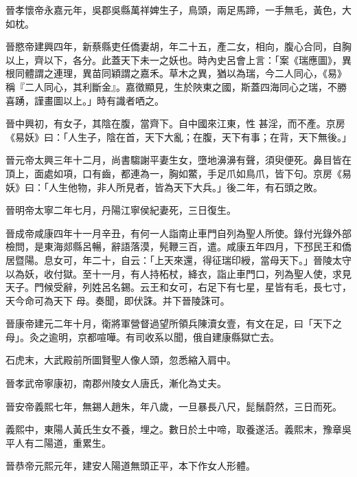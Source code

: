 \begin{pinyinscope}
 晉孝懷帝永嘉元年，吳郡吳縣萬祥婢生子，鳥頭，兩足馬蹄，一手無毛，黃色，大如枕。



 晉愍帝建興四年，新蔡縣吏任僑妻胡，年二十五，產二女，相向，腹心合同，自胸以上，齊以下，各分。此蓋天下未一之妖也。時內史呂會上言：「案《瑞應圖》，異根同體謂之連理，異苗同穎謂之嘉禾。草木之異，猶以為瑞，今二人同心，《易》稱『二人同心，其利斷金』。嘉徵顯見，生於陜東之國，斯蓋四海同心之瑞，不勝喜踴，謹畫圖以上。」時有識者哂之。



 晉中興初，有女子，其陰在腹，當齊下。自中國來江東，性
 甚淫，而不產。京房《易妖》曰：「人生子，陰在首，天下大亂；在腹，天下有事；在背，天下無後。」



 晉元帝太興三年十二月，尚書騶謝平妻生女，墮地濞濞有聲，須臾便死。鼻目皆在頂上，面處如項，口有齒，都連為一，胸如鱉，手足爪如鳥爪，皆下句。京房《易妖》曰：「人生他物，非人所見者，皆為天下大兵。」後二年，有石頭之敗。



 晉明帝太寧二年七月，丹陽江寧侯紀妻死，三日復生。



 晉成帝咸康四年十一月辛丑，有何一人詣南止車門自列為聖人所使。錄付光錄外部檢問，是東海郯縣呂暢，辭語落漠，髡鞭三百，遣。咸康五年四月，下邳民王和僑居暨陽。息女可，年二十，自云：「上天來還，得征瑞印綬，當母天下。」晉陵太守以為妖，收付獄。至十一月，有人持柘杖，絳衣，詣止車門口，列為聖人使，求見天子。門候受辭，列姓呂名錫。云王和女可，右足下有七星，星皆有毛，長七寸，天今命可為天下
 母。奏聞，即伏誅。并下晉陵誅可。



 晉康帝建元二年十月，衛將軍營督過望所領兵陳瀆女壹，有文在足，曰「天下之母」。灸之逾明，京都喧嘩。有司收系以聞，俄自建康縣獄亡去。



 石虎末，大武殿前所圖賢聖人像人頭，忽悉縮入肩中。



 晉孝武帝寧康初，南郡州陵女人唐氏，漸化為丈夫。



 晉安帝義熙七年，無錫人趙朱，年八歲，一旦暴長八尺，髭鬚蔚然，三日而死。



 義熙中，東陽人黃氏生女不養，埋之。數日於土中啼，取養遂活。義熙末，豫章吳平人有二陽道，重累生。



 晉恭帝元熙元年，建安人陽道無頭正平，本下作女人形體。




\end{pinyinscope}
